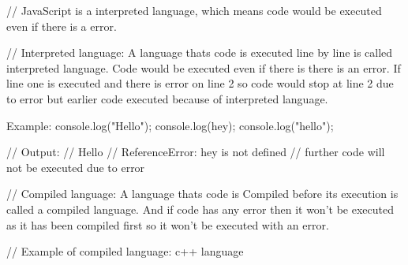 // JavaScript is a interpreted language, which means code would be executed even if there is a error.

// Interpreted language: A language thats code is executed line by line is called interpreted language. Code would be executed even if there is there is an error. If line one is executed and there is error on line 2 so code would stop at line 2 due to error but earlier code executed because of interpreted language.

Example: 
console.log("Hello");
console.log(hey);
console.log("hello");

// Output:
// Hello
// ReferenceError: hey is not defined
// further code will not be executed due to error


// Compiled language: A language thats code is Compiled before its execution is called a compiled language. And if code has any error then it won't be executed as it has been compiled first so it won't be executed with an error.

// Example of compiled language: c++ language
